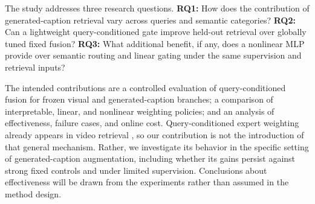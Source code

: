 The study addresses three research questions. \textbf{RQ1:} How does the contribution of generated-caption retrieval vary across queries and semantic categories? \textbf{RQ2:} Can a lightweight query-conditioned gate improve held-out retrieval over globally tuned fixed fusion? \textbf{RQ3:} What additional benefit, if any, does a nonlinear MLP provide over semantic routing and linear gating under the same supervision and retrieval inputs?

The intended contributions are a controlled evaluation of query-conditioned fusion for frozen visual and generated-caption branches; a comparison of interpretable, linear, and nonlinear weighting policies; and an analysis of effectiveness, failure cases, and online cost. Query-conditioned expert weighting already appears in video retrieval \cite{miech2018mee}, so our contribution is not the introduction of that general mechanism. Rather, we investigate its behavior in the specific setting of generated-caption augmentation, including whether its gains persist against strong fixed controls and under limited supervision. Conclusions about effectiveness will be drawn from the experiments rather than assumed in the method design.

